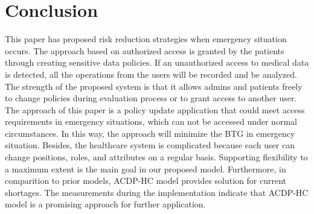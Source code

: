 
\section{Conclusion}\label{sec:conclusion}

This paper has proposed risk reduction strategies when emergency situation occurs. 
The approach based on authorized access is granted by the patients through creating sensitive data policies. 
If an unauthorized access to medical data is detected, all the operations from the users will be recorded and be analyzed.
The strength of the proposed system is that it allows admins and patients freely to change policies during evaluation process or to grant access to another user. 
The approach of this paper is a policy update application that could meet access requirements in emergency situations, which can not be accessed under normal circumstances. 
In this way, the approach will minimize the BTG in emergency situation.
Besides, the healthcare system is complicated because each user can change positions, roles, and attributes on a regular basis.
Supporting flexibility to a maximum extent is the main goal in our proposed model. 
Furthermore, in comparition to prior models, ACDP-HC model provides solution for current shortages. 
The measurements during the implementation indicate that ACDP-HC model is a promising approach for further application.


